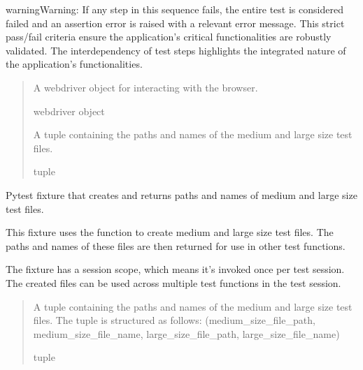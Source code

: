 \documentclass[letterpaper,10pt,english]{sphinxmanual}
\begin{document}
\begin{fulllineitems}
\begin{sphinxadmonition}{warning}{Warning:}
\sphinxAtStartPar
If any step in this sequence fails, the entire test is considered failed and an assertion error is raised with a relevant error message. This strict pass/fail criteria ensure the application’s critical functionalities are robustly validated. The interdependency of test steps highlights the integrated nature of the application’s functionalities.
\end{sphinxadmonition}
\begin{quote}\begin{description}
\sphinxAtStartPar
A webdriver object for interacting with the browser.

\sphinxAtStartPar
webdriver object

\sphinxAtStartPar
A tuple containing the paths and names of the medium and large size test files.

\sphinxAtStartPar
tuple

\end{description}\end{quote}

\end{fulllineitems}


\begin{fulllineitems}
\label{\detokenize{file_management_cycle:file_management_cycle.test_files}}
\pysigstartsignatures
{}
\pysigstopsignatures
\sphinxAtStartPar
Pytest fixture that creates and returns paths and names of medium and large size test files.

\sphinxAtStartPar
This fixture uses the  function to create medium and large size test files. 
The paths and names of these files are then returned for use in other test functions.

\sphinxAtStartPar
The fixture has a session scope, which means it’s invoked once per test session. 
The created files can be used across multiple test functions in the test session.
\begin{quote}\begin{description}
\sphinxAtStartPar
A tuple containing the paths and names of the medium and large size test files. 
The tuple is structured as follows: 
(medium\_size\_file\_path, medium\_size\_file\_name, large\_size\_file\_path, large\_size\_file\_name)

\sphinxAtStartPar
tuple

\end{description}\end{quote}

\end{fulllineitems}
\end{document}
